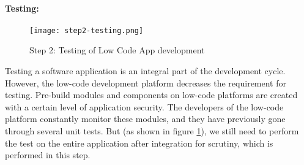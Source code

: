 \paragraph*{Testing:}
\begin{figure}[htbp!]
  \centering    
  \texttt{[image: step2-testing.png]}
  \caption[Testing]{Step 2: Testing of Low Code App development}
  \label{fig:background:testing}
\end{figure}
Testing a software application is an integral part of the development cycle.
However, the low-code development platform decreases the requirement for testing. 
Pre-build modules and components on low-code platforms are created with a certain level of application security. 
The developers of the low-code platform constantly monitor these modules, and they have previously gone through several unit tests.
But (as shown in figure \ref{fig:background:testing}), we still need to perform the test on the entire application after integration for scrutiny, which is performed in this step.

